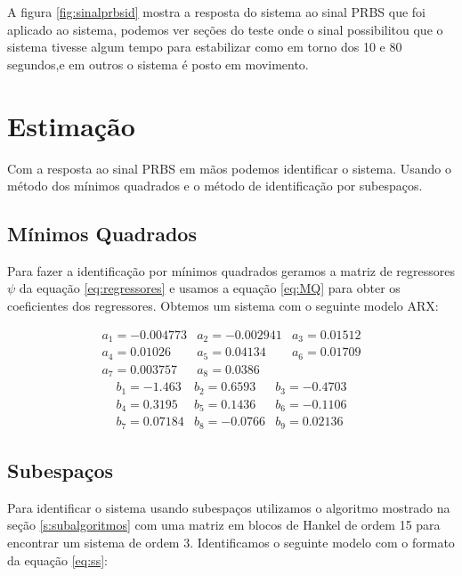 A figura \ref{fig:sinalprbsid} mostra a resposta do sistema ao sinal PRBS que foi aplicado ao sistema, podemos ver seções do teste onde o sinal possibilitou que o sistema tivesse algum tempo para estabilizar como em torno dos 10 e 80 segundos,e em outros o sistema é posto em movimento.

\section{Estimação}\label{s:4estimacao}

Com a resposta ao sinal PRBS em mãos podemos identificar o sistema. Usando o método dos mínimos quadrados e o método de identificação por subespaços.

\subsection{Mínimos Quadrados}\label{s:4estmq}
Para fazer a identificação por mínimos quadrados geramos a matriz de regressores $\psi$ da equação \eqref{eq:regressores} e usamos a equação \eqref{eq:MQ} para obter os coeficientes dos regressores. Obtemos um sistema com o seguinte modelo ARX:

\begin{equation}
\begin{matrix}
a_1= -0.004773 &
a_2= -0.002941&
a_3=  0.01512 \\
a_4=  0.01026 &
a_5=  0.04134 &
a_6=  0.01709\\
a_7=  0.003757 &
a_8=  0.0386
\end{matrix}
\end{equation}
\begin{equation}
\begin{matrix}
b_1= -1.463&
b_2=  0.6593&
b_3= -0.4703\\
b_4=  0.3195&
b_5=  0.1436&
b_6= -0.1106\\
b_7=  0.07184&
b_8= -0.0766& 
b_9=  0.02136
\end{matrix}
\end{equation}

\subsection{Subespaços}\label{s:4estsub}

Para identificar o sistema usando subespaços utilizamos o algoritmo mostrado na seção \ref{s:subalgoritmos} com uma matriz em blocos de Hankel de ordem 15 para encontrar um sistema de ordem 3. Identificamos o seguinte modelo com o formato da equação \eqref{eq:ss}:

